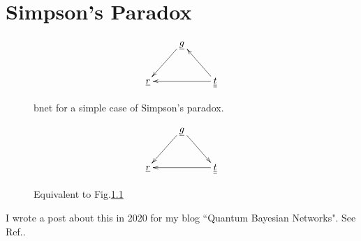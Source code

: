 \chapter{Simpson's Paradox}

\begin{figure}[h!]
\centering
$$\xymatrix{
&\rvg\ar[dl]&\\
\rvr&&\ul{\rvt}\ar[ul]\ar[ll]
}$$
\caption{bnet for a simple case of 
Simpson's paradox.}
\label{fig-simpson-a}
\end{figure}

\begin{figure}[h!]
\centering
$$\xymatrix{
&\rvg\ar[dl]\ar[dr]&\\
\rvr&&\ul{\rvt}\ar[ll]
}$$
\caption{Equivalent to 
Fig.\ref{fig-simpson-a}}
\label{fig-simpson-b}
\end{figure}

I wrote a post about
this in 2020 for
my blog ``Quantum Bayesian Networks". 
See Ref.\cite{simpson-blog}.
